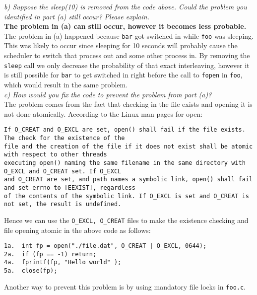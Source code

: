 \noindent \textit{b) Suppose the sleep(10) is removed from the code above. Could the problem you identified in part (a) still occur? Please explain.}\\

\noindent \textbf{The problem in (a) can still occur, however it becomes less probable.} The problem in (a) happened because \verb+bar+ got switched in while \verb+foo+ was sleeping. This was likely to occur since sleeping for 10 seconds will probably cause the scheduler to switch that process out and some other process in. By removing the \verb+sleep+ call we only decrease the probability of that exact interleaving, however it is still possible for \verb+bar+ to get switched in right before the call to \verb+fopen+ in \verb+foo+, which would result in the same problem.\\

\noindent \textit{c) How would you fix the code to prevent the problem from part (a)?}\\

\noindent The problem comes from the fact that checking in the file exists and opening it is not done atomically. According to the Linux man pages for open:
\begin{verbatim}
If O_CREAT and O_EXCL are set, open() shall fail if the file exists. The check for the existence of the
file and the creation of the file if it does not exist shall be atomic with respect to other threads
executing open() naming the same filename in the same directory with O_EXCL and O_CREAT set. If O_EXCL
and O_CREAT are set, and path names a symbolic link, open() shall fail and set errno to [EEXIST], regardless
of the contents of the symbolic link. If O_EXCL is set and O_CREAT is not set, the result is undefined.
\end{verbatim}
Hence we can use the \verb+O_EXCL, O_CREAT+ files to make the existence checking and file opening atomic in the above code as follows:
\begin{verbatim}
1a.  int fp = open("./file.dat", O_CREAT | O_EXCL, 0644);
2a.  if (fp == -1) return;
4a.  fprintf(fp, "Hello world" );
5a.  close(fp);
\end{verbatim}
Another way to prevent this problem is by using mandatory file locks in \verb+foo.c+.